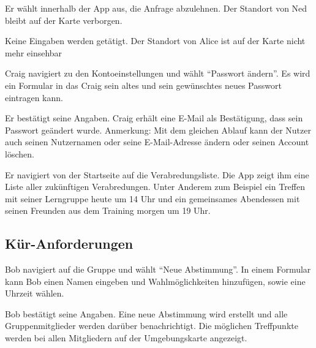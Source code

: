 \documentclass[parskip=full,11pt]{scrartcl}
\begin{document}
{Er wählt innerhalb der App aus, die Anfrage abzulehnen.}
{Der Standort von Ned bleibt auf der Karte verborgen.}

{Keine Eingaben werden getätigt.}
{Der Standort von Alice ist auf der Karte nicht mehr einsehbar}


{Craig navigiert zu den Kontoeinstellungen und wählt \enquote{Passwort ändern}.}
{Es wird ein Formular in das Craig sein altes und sein gewünschtes neues Passwort eintragen kann.}

{Er bestätigt seine Angaben.}
{Craig erhält eine E-Mail als Bestätigung, dass sein Passwort geändert wurde.}
Anmerkung: Mit dem gleichen Ablauf kann der Nutzer auch seinen Nutzernamen oder seine
E-Mail-Adresse ändern oder seinen Account löschen.



{Er navigiert von der Startseite auf die Verabredungsliste.}
{Die App zeigt ihm eine Liste aller zukünftigen Verabredungen.
Unter Anderem zum Beispiel ein Treffen mit seiner Lerngruppe heute um 14 Uhr
und ein gemeinsames Abendessen mit seinen Freunden aus dem Training morgen um 19 Uhr.}


\subsection{Kür-Anforderungen}
{Bob navigiert auf die Gruppe und wählt \enquote{Neue Abstimmung}.}
{In einem Formular kann Bob einen Namen eingeben und Wahlmöglichkeiten hinzufügen,
	sowie eine Uhrzeit wählen.}

{Bob bestätigt seine Angaben.}
{Eine neue Abstimmung wird erstellt und alle Gruppenmitglieder werden darüber benachrichtigt.
Die möglichen Treffpunkte werden bei allen Mitgliedern auf der Umgebungskarte angezeigt.}
\end{document}
